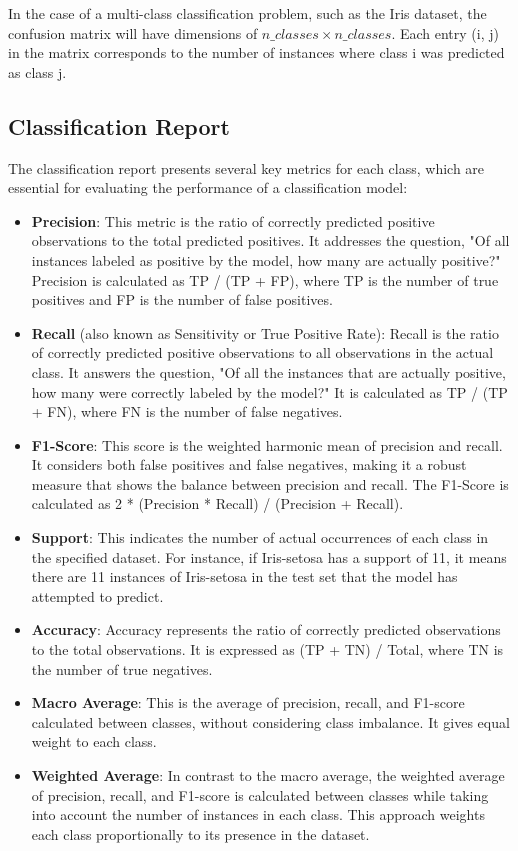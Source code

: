 In the case of a multi-class classification problem, such as the Iris dataset, the confusion matrix will have dimensions of \( n\_classes \times n\_classes \). Each entry (i, j) in the matrix corresponds to the number of instances where class i was predicted as class j.

\subsection{Classification Report}
The classification report presents several key metrics for each class, which are essential for evaluating the performance of a classification model:

\begin{itemize}
	\item \textbf{Precision}: This metric is the ratio of correctly predicted positive observations to the total predicted positives. It addresses the question, "Of all instances labeled as positive by the model, how many are actually positive?" Precision is calculated as TP / (TP + FP), where TP is the number of true positives and FP is the number of false positives.
	
	\item \textbf{Recall} (also known as Sensitivity or True Positive Rate): Recall is the ratio of correctly predicted positive observations to all observations in the actual class. It answers the question, "Of all the instances that are actually positive, how many were correctly labeled by the model?" It is calculated as TP / (TP + FN), where FN is the number of false negatives.
	
	\item \textbf{F1-Score}: This score is the weighted harmonic mean of precision and recall. It considers both false positives and false negatives, making it a robust measure that shows the balance between precision and recall. The F1-Score is calculated as 2 * (Precision * Recall) / (Precision + Recall).
	
	\item \textbf{Support}: This indicates the number of actual occurrences of each class in the specified dataset. For instance, if Iris-setosa has a support of 11, it means there are 11 instances of Iris-setosa in the test set that the model has attempted to predict.
	
	\item \textbf{Accuracy}: Accuracy represents the ratio of correctly predicted observations to the total observations. It is expressed as (TP + TN) / Total, where TN is the number of true negatives.
	
	\item \textbf{Macro Average}: This is the average of precision, recall, and F1-score calculated between classes, without considering class imbalance. It gives equal weight to each class.
	
	\item \textbf{Weighted Average}: In contrast to the macro average, the weighted average of precision, recall, and F1-score is calculated between classes while taking into account the number of instances in each class. This approach weights each class proportionally to its presence in the dataset.
\end{itemize}
